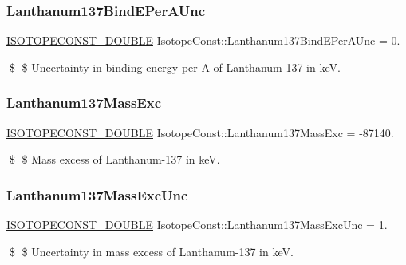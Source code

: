 \subsubsection{\texorpdfstring{Lanthanum137\+Bind\+E\+Per\+A\+Unc}{Lanthanum137BindEPerAUnc}}
{\footnotesize\ttfamily \mbox{\hyperlink{group___isotope_const-_macros_ga8f45a7272ce02c0b4c65c44636ed719a}{I\+S\+O\+T\+O\+P\+E\+C\+O\+N\+S\+T\+\_\+\+D\+O\+U\+B\+LE}} Isotope\+Const\+::\+Lanthanum137\+Bind\+E\+Per\+A\+Unc = 0.}

\$ \$ Uncertainty in binding energy per A of Lanthanum-\/137 in keV. \mbox{\label{group___isotope_const-_lanthanum-_la137_ga7654931bd0a530c4a949a291257f7330}} 
\subsubsection{\texorpdfstring{Lanthanum137\+Mass\+Exc}{Lanthanum137MassExc}}
{\footnotesize\ttfamily \mbox{\hyperlink{group___isotope_const-_macros_ga8f45a7272ce02c0b4c65c44636ed719a}{I\+S\+O\+T\+O\+P\+E\+C\+O\+N\+S\+T\+\_\+\+D\+O\+U\+B\+LE}} Isotope\+Const\+::\+Lanthanum137\+Mass\+Exc = -\/87140.}

\$ \$ Mass excess of Lanthanum-\/137 in keV. \mbox{\label{group___isotope_const-_lanthanum-_la137_ga17c0471e174c8b2b3043cc39249e0407}} 
\subsubsection{\texorpdfstring{Lanthanum137\+Mass\+Exc\+Unc}{Lanthanum137MassExcUnc}}
{\footnotesize\ttfamily \mbox{\hyperlink{group___isotope_const-_macros_ga8f45a7272ce02c0b4c65c44636ed719a}{I\+S\+O\+T\+O\+P\+E\+C\+O\+N\+S\+T\+\_\+\+D\+O\+U\+B\+LE}} Isotope\+Const\+::\+Lanthanum137\+Mass\+Exc\+Unc = 1.}

\$ \$ Uncertainty in mass excess of Lanthanum-\/137 in keV. \mbox{\label{group___isotope_const-_lanthanum-_la137_gad7d78270602f105845ee55f6fe3201f1}} 
